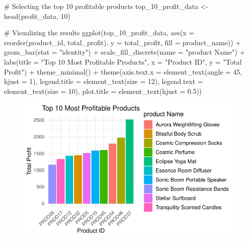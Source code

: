 \documentclass[
  letterpaper,
  DIV=11,
  numbers=noendperiod]{scrartcl}
\newenvironment{Shaded}{\begin{snugshade}}{\end{snugshade}}
\newcommand{\AttributeTok}[1]{\textcolor[rgb]{0.40,0.45,0.13}{#1}}
\newcommand{\CommentTok}[1]{\textcolor[rgb]{0.37,0.37,0.37}{#1}}
\newcommand{\DecValTok}[1]{\textcolor[rgb]{0.68,0.00,0.00}{#1}}
\newcommand{\FloatTok}[1]{\textcolor[rgb]{0.68,0.00,0.00}{#1}}
\newcommand{\FunctionTok}[1]{\textcolor[rgb]{0.28,0.35,0.67}{#1}}
\newcommand{\NormalTok}[1]{\textcolor[rgb]{0.00,0.23,0.31}{#1}}
\newcommand{\OtherTok}[1]{\textcolor[rgb]{0.00,0.23,0.31}{#1}}
\newcommand{\SpecialCharTok}[1]{\textcolor[rgb]{0.37,0.37,0.37}{#1}}
\newcommand{\StringTok}[1]{\textcolor[rgb]{0.13,0.47,0.30}{#1}}
\begin{document}
\begin{Shaded}
\begin{Highlighting}[]
\CommentTok{\# Selecting the top 10 profitable products}
\NormalTok{top\_10\_profit\_data }\OtherTok{\textless{}{-}} \FunctionTok{head}\NormalTok{(profit\_data, }\DecValTok{10}\NormalTok{)}


\CommentTok{\# Visualizing the results }
\FunctionTok{ggplot}\NormalTok{(top\_10\_profit\_data, }\FunctionTok{aes}\NormalTok{(}\AttributeTok{x =} \FunctionTok{reorder}\NormalTok{(product\_id, total\_profit), }\AttributeTok{y =}\NormalTok{ total\_profit, }\AttributeTok{fill =}\NormalTok{ product\_name)) }\SpecialCharTok{+}
  \FunctionTok{geom\_bar}\NormalTok{(}\AttributeTok{stat =} \StringTok{"identity"}\NormalTok{) }\SpecialCharTok{+}
  \FunctionTok{scale\_fill\_discrete}\NormalTok{(}\AttributeTok{name =} \StringTok{"product Name"}\NormalTok{) }\SpecialCharTok{+} 
  \FunctionTok{labs}\NormalTok{(}\AttributeTok{title =} \StringTok{"Top 10 Most Profitable Products"}\NormalTok{, }\AttributeTok{x =} \StringTok{"Product ID"}\NormalTok{, }\AttributeTok{y =} \StringTok{"Total Profit"}\NormalTok{) }\SpecialCharTok{+}
  \FunctionTok{theme\_minimal}\NormalTok{() }\SpecialCharTok{+}
  \FunctionTok{theme}\NormalTok{(}\AttributeTok{axis.text.x =} \FunctionTok{element\_text}\NormalTok{(}\AttributeTok{angle =} \DecValTok{45}\NormalTok{, }\AttributeTok{hjust =} \DecValTok{1}\NormalTok{),}
        \AttributeTok{legend.title =} \FunctionTok{element\_text}\NormalTok{(}\AttributeTok{size =} \DecValTok{12}\NormalTok{), }
        \AttributeTok{legend.text =} \FunctionTok{element\_text}\NormalTok{(}\AttributeTok{size =} \DecValTok{10}\NormalTok{), }
        \AttributeTok{plot.title =} \FunctionTok{element\_text}\NormalTok{(}\AttributeTok{hjust =} \FloatTok{0.5}\NormalTok{)) }
\end{Highlighting}
\end{Shaded}

\begin{figure}[H]

{\centering \includegraphics{Report_files/figure-pdf/unnamed-chunk-26-1.pdf}

}

\end{figure}
\end{document}
